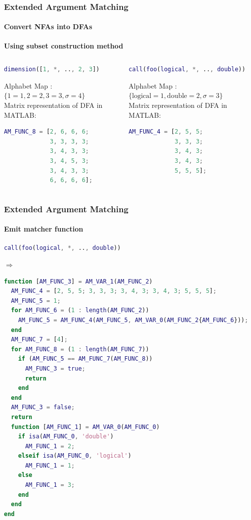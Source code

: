 \documentclass[10pt]{beamer}
\begin{document}
\begin{frame}[fragile]
\frametitle{Extended Argument Matching}
\framesubtitle{Convert NFAs into DFAs}
\textbf{Using subset construction method}

\begin{columns}
\begin{column}[T]{0.5\textwidth}
\begin{lstlisting}[basicstyle=\small, language=MATLAB]
dimension([1, *, .., 2, 3])
\end{lstlisting}
Alphabet Map : $\lbrace 1 = 1, 2 = 2, 3 = 3, \sigma = 4 \rbrace$             \\
Matrix representation of DFA in MATLAB:
\begin{lstlisting}[basicstyle=\small, language=MATLAB]
AM_FUNC_8 = [2, 6, 6, 6; 
             3, 3, 3, 3; 
             3, 4, 3, 3; 
             3, 4, 5, 3; 
             3, 4, 3, 3; 
             6, 6, 6, 6];
\end{lstlisting}
\end{column}
\begin{column}[T]{0.5\textwidth}
\begin{lstlisting}[basicstyle=\small, language=MATLAB]
call(foo(logical, *, .., double))
\end{lstlisting}
Alphabet Map : $\lbrace \text{logical} = 1, \text{double} = 2, 
                        \sigma = 3                              \rbrace$     \\
                        Matrix representation of DFA in MATLAB:
\begin{lstlisting}[basicstyle=\small, language=MATLAB]
AM_FUNC_4 = [2, 5, 5; 
             3, 3, 3; 
             3, 4, 3; 
             3, 4, 3; 
             5, 5, 5];
\end{lstlisting}
\end{column}
\end{columns}
\end{frame}

\begin{frame}[fragile]
\frametitle{Extended Argument Matching}
\framesubtitle{Emit matcher function}
\begin{lstlisting}[basicstyle=\small, language=MATLAB]
call(foo(logical, *, .., double))
\end{lstlisting}
$\Rightarrow$
\begin{lstlisting}[basicstyle=\tiny, language=MATLAB]
function [AM_FUNC_3] = AM_VAR_1(AM_FUNC_2)
  AM_FUNC_4 = [2, 5, 5; 3, 3, 3; 3, 4, 3; 3, 4, 3; 5, 5, 5];
  AM_FUNC_5 = 1;
  for AM_FUNC_6 = (1 : length(AM_FUNC_2))
    AM_FUNC_5 = AM_FUNC_4(AM_FUNC_5, AM_VAR_0(AM_FUNC_2{AM_FUNC_6}));
  end
  AM_FUNC_7 = [4];
  for AM_FUNC_8 = (1 : length(AM_FUNC_7))
    if (AM_FUNC_5 == AM_FUNC_7(AM_FUNC_8))
      AM_FUNC_3 = true;
      return
    end
  end
  AM_FUNC_3 = false;
  return
  function [AM_FUNC_1] = AM_VAR_0(AM_FUNC_0)
    if isa(AM_FUNC_0, 'double')
      AM_FUNC_1 = 2;
    elseif isa(AM_FUNC_0, 'logical')
      AM_FUNC_1 = 1;
    else 
      AM_FUNC_1 = 3;
    end
  end
end
\end{lstlisting}
\end{frame}
\end{document}
